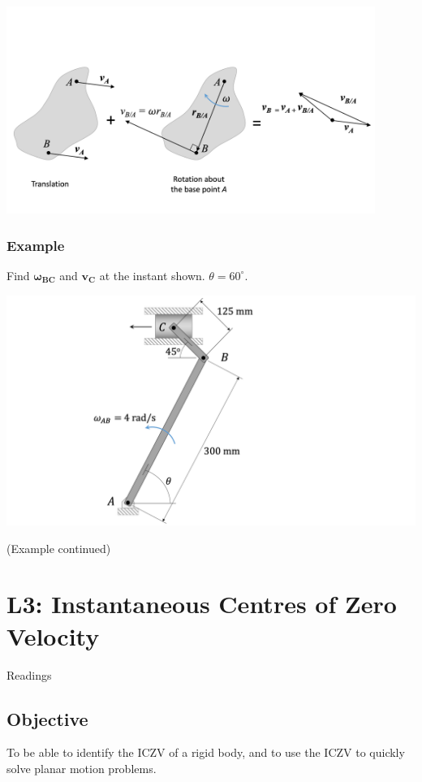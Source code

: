 \documentclass[12pt,letterpaper,twoside]{report}
\begin{document}
\includegraphics[trim={0cm 1cm 0cm 4cm},clip,width=0.9\textwidth, center]{Slide14}

\subsection{Example}
Find $\bm{\omega_{BC}}$ and $\bm{v_C}$ at the instant shown.  $\theta = 60^{\circ}$.

\begin{minipage}[l]{0.6\textwidth}
\includegraphics[trim={5cm 0cm 6cm 0cm},clip,width=1\textwidth, center]{Slide15}
\end{minipage}

\newpage

(Example continued)


\chapter{L3: Instantaneous Centres of Zero Velocity}
Readings

\section{Objective}
To be able to identify the ICZV of a rigid body, and to use the ICZV to quickly solve planar motion problems. 
\end{document}
